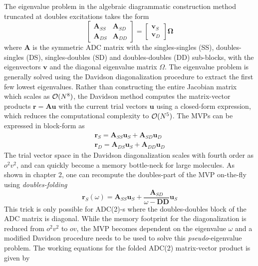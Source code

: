 The eigenvalue problem in the algebraic diagrammatic construction method truncated at doubles excitations takes the form
\begin{equation}
\begin{bmatrix}
\mathbf{A}_{SS} & \mathbf{A}_{SD} \\
\mathbf{A}_{DS} & \mathbf{A}_{DD}
\end{bmatrix} =  
\begin{bmatrix}
\mathbf{v}_{S} \\
\mathbf{v}_{D}
\end{bmatrix}
\mathbf{\Omega}
\end{equation}
\noindent where $\mathbf{A}$ is the symmetric ADC matrix with the singles-singles (SS), doubles-singles (DS), singles-doubles (SD) and doubles-doubles (DD) sub-blocks, with the eigenvectors $\mathbf{v}$ and the diagonal eigenvalue matrix $\Omega$. The eigenvalue problem is generally solved using the Davidson diagonalization procedure to extract the first few lowest eigenvalues. Rather than constructing the entire Jacobian matrix which scales as $\mathcal{O}(N^{8})$, the Davidson method computes the matrix-vector products $\mathbf{r} = \mathbf{A} \mathbf{u}$ with the current trial vectors $\mathbf{u}$ using a closed-form expression, which reduces the computational complexity to $\mathcal{O}(N^{5})$. The MVPs can be expressed in block-form as
\begin{equation}
\begin{split}
\mathbf{r}_{S} = \mathbf{A}_{SS} \mathbf{u}_{S} + \mathbf{A}_{SD} \mathbf{u}_{D} \\
\mathbf{r}_{D} = \mathbf{A}_{DS} \mathbf{u}_{S} + \mathbf{A}_{DD} \mathbf{u}_{D}
\end{split} 
\end{equation}
\noindent The trial vector space in the Davidson diagonalization scales with fourth order as $o^2v^2$, and can quickly become a memory bottle-neck for large molecules. As shown in chapter 2, one can recompute the doubles-part of the MVP on-the-fly using \emph{doubles-folding}
\begin{equation}
\mathbf{r}_S(\omega) = \mathbf{A}_{SS} \mathbf{u}_{S} + \frac{\mathbf{A}_{SD}}{\omega - \mathbf{DD}} \mathbf{u}_{S} 
\end{equation} 
\noindent This trick is only possible for ADC(2)-s where the doubles-doubles block of the ADC matrix is diagonal. While the memory footprint for the diagonalization is reduced from $o^2v^2$ to $ov$, the MVP becomes dependent on the eigenvalue $\omega$ and a modified Davidson procedure needs to be used to solve this \emph{pseudo}-eigenvalue problem. The working equations for the folded ADC(2) matrix-vector product is given by \cite{Wor2009}
